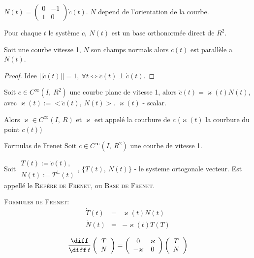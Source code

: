 		\begin{remark}
			$N(t)=\left(\begin{array}{cr} 0 & -1 \\ 1 & 0\end{array}\right)\dot{c}(t)$. $N$ depend de l'orientation de la courbe.
		\end{remark}

		Pour chaque $t$ le système ${\dot{c},\ N(t)}$ est un base orthonormée direct de $R^2$.

		\begin{lemme}
			Soit une courbe vitesse 1, $N$ son champs normals alors $\ddot{c}(t)$ est parallèle a $N(t)$.
		\end{lemme}
		\begin{proof}
			Idee $||\dot{c}(t)||=1,\ \forall t \Longleftrightarrow \ddot{c}(t)\perp\dot{c}(t)$.
		\end{proof}

		\begin{definition}
			Soit $c\in C^\infty(I,\ R^2)$ une courbe plane de vitesse 1, alors $\ddot{c}(t)=\varkappa(t)N(t)$, avec $\varkappa(t):=<\ddot{c}(t),\ N(t)>$.
			$\varkappa(t)$ - scalar.
	
			Alors $\varkappa\in C^\infty (I,\ R)$ et $\varkappa$ est appelé la courbure de $c$ ($\varkappa(t)$ la courbure du point $c(t)$)
		\end{definition}

		\begin{theorem}{Formulas de Frenet}
			Soit $c\in C^\infty(I,\ R^2)$ une courbe de vitesse 1.
	
			Soit $\begin{array}{c}T(t):=\dot{c}(t),\\ N(t):=T^\perp (t) \end{array}$, $\{T(t),\ N(t)\}$ - le systeme ortogonale vecteur. Est appellé le \textsc{Repére de Frenet}, ou \textsc{Base de Frenet}. 
			
			\textsc{Formules de Frenet}:
			$$\begin{array}{rcl}\dot{T}(t)&=&\varkappa(t)N(t)\\ \dot{N}(t)&=&-\varkappa(t)T(T)\end{array}$$
		\end{theorem}

		\begin{remark}
			$$\frac{\diff}{\diff\, t}\left(
			\begin{array}{c}
				T\\N\end{array}\right) = \left(\begin{array}{cc}0 & \varkappa\\
				-\varkappa & 0
			\end{array}
			\right) \left(\begin{array}{c}T\\N\end{array}\right)$$
		\end{remark}

